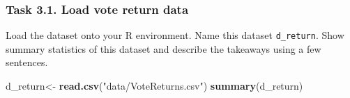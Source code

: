 \documentclass[
]{article}
\newenvironment{Shaded}{\begin{snugshade}}{\end{snugshade}}
\newcommand{\FunctionTok}[1]{\textcolor[rgb]{0.13,0.29,0.53}{\textbf{#1}}}
\newcommand{\NormalTok}[1]{#1}
\newcommand{\OtherTok}[1]{\textcolor[rgb]{0.56,0.35,0.01}{#1}}
\newcommand{\StringTok}[1]{\textcolor[rgb]{0.31,0.60,0.02}{#1}}
\begin{document}
\hypertarget{task-3.1.-load-vote-return-data}{%
\subsubsection{Task 3.1. Load vote return
data}\label{task-3.1.-load-vote-return-data}}

Load the dataset onto your R environment. Name this dataset
\texttt{d\_return}. Show summary statistics of this dataset and describe
the takeaways using a few sentences.

\begin{Shaded}
\begin{Highlighting}[]
\NormalTok{d\_return}\OtherTok{\textless{}{-}} \FunctionTok{read.csv}\NormalTok{(}\StringTok{"data/VoteReturns.csv"}\NormalTok{)}
\FunctionTok{summary}\NormalTok{(d\_return)}
\end{Highlighting}
\end{Shaded}
\end{document}

